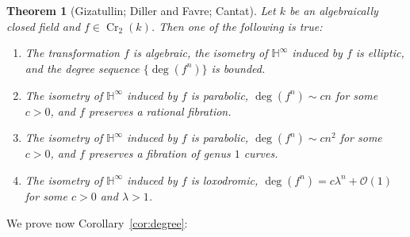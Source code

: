 \documentclass[JEP,XML,SOM,Unicode, NoEqCountersInSection,published]{cedram}
\newcommand{\h}{\operatorname{\mathbb{H}^{\infty}}}
\newcommand{\kk}{k}
\newcommand{\Cr}{\operatorname{Cr}}
\theoremstyle{plain}
\newtheorem{theorem}{Theorem}[section]
\theoremstyle{definition}
\begin{document}
\begin{theorem}[Gizatullin; Diller and Favre; Cantat]\label{thm:hyperboloid}
Let $\kk$ be an algebraically closed field and $f\in\Cr_2(k)$. Then one of the following is true:
\begin{enumerate}
\item The transformation $f$ is algebraic, the isometry of $\h$ induced by $f$ is elliptic, and the degree sequence $\{\deg(f^n)\}$ is bounded.
\item[(2a)] The isometry of $\h$ induced by $f$ is parabolic, $\deg(f^n)\sim cn$ for some $c>0$, and $f$ preserves a rational fibration.
\item[(2b)] The isometry of $\h$ induced by $f$ is parabolic, $\deg(f^n)\sim cn^2$ for some $c>0$, and $f$ preserves a fibration of genus $1$ curves.
\item[(3)] The isometry of $\h$ induced by $f$ is loxodromic, $\deg(f^n)=c\lambda^n +\mathcal{O}(1)$ for some $c>0$ and $\lambda>1$.
\end{enumerate}
\end{theorem}

We prove now Corollary~\ref{cor:degree}:
\end{document}
